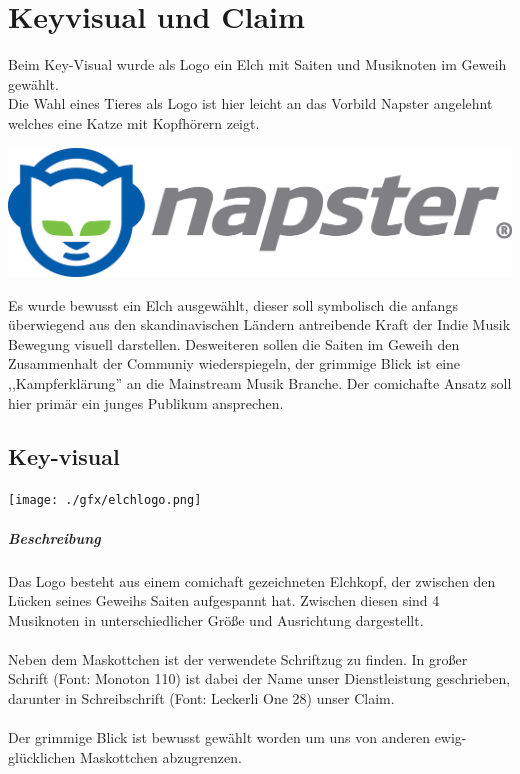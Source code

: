 \chapter{Keyvisual und Claim}
\label{keyvisual_claim}

Beim Key-Visual wurde als Logo ein Elch mit Saiten und Musiknoten im Geweih
gewählt.
\\
Die Wahl eines Tieres als Logo ist hier leicht an das Vorbild Napster
angelehnt welches eine Katze mit Kopfhörern zeigt.

\begin{center}
    \includegraphics[scale=0.4]{./gfx/napster.jpeg}
\end{center}

Es wurde bewusst ein Elch ausgewählt, dieser soll symbolisch die anfangs
überwiegend aus den skandinavischen Ländern antreibende Kraft der Indie Musik
Bewegung visuell darstellen. Desweiteren sollen die Saiten im Geweih den
Zusammenhalt der Communiy wiederspiegeln, der grimmige Blick ist eine
,,Kampferklärung'' an die Mainstream Musik Branche. Der comichafte Ansatz soll
hier primär ein junges Publikum ansprechen.

\section{Key-visual}
\begin{center}
    \texttt{[image: ./gfx/elchlogo.png]}
\end{center}

\paragraph{Beschreibung} Das Logo besteht aus einem comichaft gezeichneten
Elchkopf, der zwischen den Lücken seines Geweihs Saiten aufgespannt hat.
Zwischen diesen sind 4 Musiknoten in unterschiedlicher Größe und Ausrichtung 
dargestellt. 
\\
\\
Neben dem Maskottchen ist der verwendete Schriftzug zu finden.
In großer Schrift (Font: Monoton 110) ist dabei der Name unser Dienstleistung
geschrieben, darunter in Schreibschrift (Font: Leckerli One 28) unser Claim.
\\
\\
Der grimmige Blick ist bewusst gewählt worden um uns von anderen
ewig-glücklichen Maskottchen abzugrenzen.


